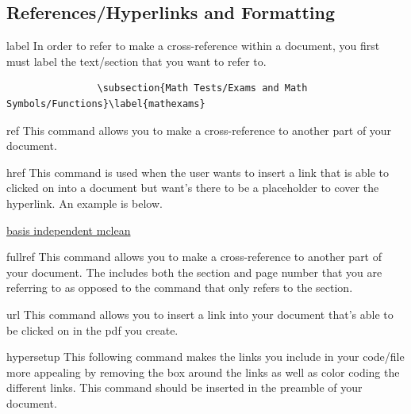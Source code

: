 	\subsection{References/Hyperlinks and Formatting}
		\begin{docCommand}{label}{}
			In order to refer to make a cross-reference within a document, you first must label the text/section that you want to refer to.
		\end{docCommand}
		\begin{verbatim}
	            \subsection{Math Tests/Exams and Math Symbols/Functions}\label{mathexams}
		\end{verbatim}
		\begin{docCommand}{ref}{}
			This command allows you to make a cross-reference to another part of your document. 
		\end{docCommand}
		\begin{docCommand}{href}{}
			This command is used when the user wants to insert a link that is able to clicked on into a document but want's there to be a placeholder to cover the hyperlink. An example is below. 
		\end{docCommand}
\begin{disexam}
\href{mailto:armindubert19@gmail.com}{basis independent mclean}
\end{disexam}
		\begin{docCommand}{fullref}{}
			This command allows you to make a cross-reference to another part of your document. The  includes both the section and page number that you are referring to as opposed to the command  that only refers to the section.
		\end{docCommand}
		\begin{docCommand}{url}{}
			This command allows you to insert a link into your document that's able to be clicked on in the pdf you create.
		\end{docCommand}
		\begin{docCommand}{hypersetup}{}
			This following command makes the links you include in your code/file more appealing by removing the box around the links as well as color coding the different links. This command should be inserted in the preamble of your document.
		\end{docCommand}
